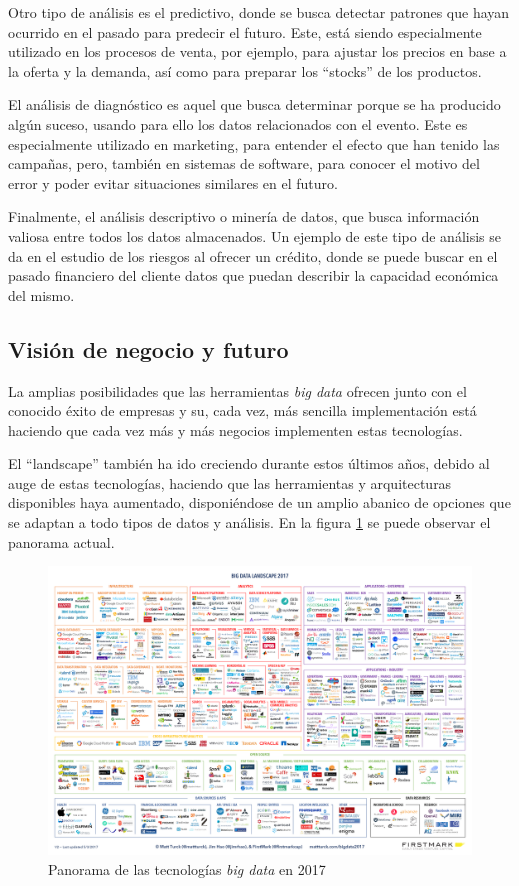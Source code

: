 Otro tipo de análisis es el predictivo, donde se busca detectar patrones que hayan ocurrido en el pasado para predecir el futuro. Este, está siendo especialmente utilizado en los procesos de venta, por ejemplo, para ajustar los precios en base a la oferta y la demanda, así como para preparar los ``stocks'' de los productos.

El análisis de diagnóstico es aquel que busca determinar porque se ha producido algún suceso, usando para ello los datos relacionados con el evento. Este es especialmente utilizado en marketing, para entender el efecto que han tenido las campañas, pero, también en sistemas de software, para conocer el motivo del error y poder evitar situaciones similares en el futuro.

Finalmente, el análisis descriptivo o minería de datos, que busca información valiosa entre todos los datos almacenados. Un ejemplo de este tipo de análisis se da en el estudio de los riesgos al ofrecer un crédito, donde se puede buscar en el pasado financiero del cliente datos que puedan describir la capacidad económica del mismo.

\clearpage
\subsection{Visión de negocio y futuro}
La amplias posibilidades que las herramientas \textit{big data} ofrecen junto con el conocido éxito de empresas y su, cada vez, más sencilla implementación está haciendo que cada vez más y más negocios implementen estas tecnologías.

El ``landscape'' también ha ido creciendo durante estos últimos años, debido al auge de estas tecnologías, haciendo que las herramientas y arquitecturas disponibles haya aumentado, disponiéndose de un amplio abanico de opciones que se adaptan a todo tipos de datos y análisis. En la figura \ref{landscape} se puede observar el panorama actual.

\begin{figure}[htp!]
	\centering
	\caption{Panorama de las tecnologías \textit{big data} en 2017 \cite{landscape}}
	\label{landscape}
	\vspace{5pt}
	\includegraphics[scale=0.22]{graphics/landscape}
\end{figure}


